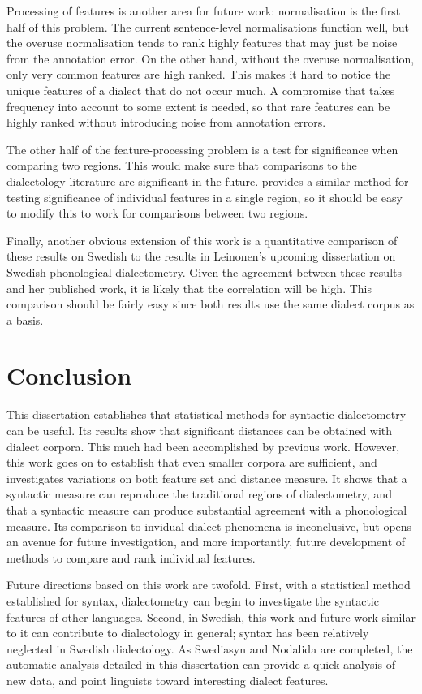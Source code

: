 Processing of features is another area for future work: normalisation
is the first half of this problem. The current sentence-level
normalisations function well, but the overuse normalisation tends to
rank highly features that may just be noise from the annotation
error. On the other hand, without the overuse normalisation, only very
common features are high ranked. This makes it hard to notice the
unique features of a dialect that do not occur much. A compromise that
takes frequency into account to some extent is needed, so that rare
features can be highly ranked without introducing noise from
annotation errors.

The other half of the feature-processing problem is a test for
significance when comparing two regions. This would make sure that
comparisons to the dialectology literature are significant in the
future.  provides a similar method for testing
significance of individual features in a single region, so it should
be easy to modify this to work for comparisons between two regions.

Finally, another obvious extension of this work is a quantitative
comparison of these results on Swedish to the results in Leinonen's
upcoming dissertation on Swedish phonological dialectometry. Given the
agreement between these results and her published work, it is likely
that the correlation will be high. This comparison should be fairly
easy since both results use the same dialect corpus as a basis.

\section{Conclusion}

This dissertation establishes that statistical methods for syntactic
dialectometry can be useful. Its results show that significant
distances can be obtained with dialect corpora. This much had been
accomplished by previous work. However, this work goes on to establish
that even smaller corpora are sufficient, and investigates variations
on both feature set and distance measure. It shows that a syntactic
measure can reproduce the traditional regions of dialectometry, and
that a syntactic measure can produce substantial agreement with a
phonological measure. Its comparison to invidual dialect phenomena is
inconclusive, but opens an avenue for future investigation, and more
importantly, future development of methods to compare and rank
individual features.

Future directions based on this work are twofold. First, with a
statistical method established for syntax, dialectometry can begin to
investigate the syntactic features of other languages. Second, in
Swedish, this work and future work similar to it can contribute to
dialectology in general; syntax has been relatively neglected in
Swedish dialectology. As Swediasyn and Nodalida are completed, the
automatic analysis detailed in this dissertation can provide a quick
analysis of new data, and point linguists toward interesting dialect
features.

